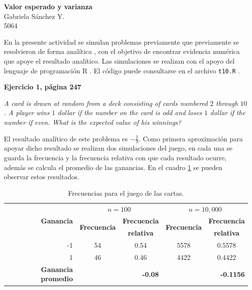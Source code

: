 \documentclass[12pt]{article}
\begin{document}
	\thispagestyle{empty}

	\begin{center}
		{\Large \bf Valor esperado y varianza}\\
		Gabriela S\'anchez Y.\\
		5064
	\end{center}
  
  	En la presente actividad se simulan problemas previamente que previamente se resolvieron de forma analítica \cite{mpa_gabyt9}, con el objetivo de encontrar evidencia numérica que apoye el resultado analítico. Las simulaciones se realizan con el apoyo del lenguaje de programación \textsc{R} \cite{rstatistics}. El código puede consultarse en el archivo \texttt{t10.R} \cite{mpa_gaby}.
	
	{\bf Ejercicio 1, página 247}
	
	{\em A card is drawn at random from a deck consisting of cards numbered $2$ through $10$. A player wins $1$ dollar if the number on the card is odd and loses $1$ dollar if the number if even. What is the expected value of his winnings?}
	
	El resultado analítico de este problema es $-\frac{1}{9}$. Como primera aproximación para apoyar dicho resultado se realizan dos simulaciones del juego, en cada una se guarda la frecuencia y la frecuencia relativa con que cada resultado ocurre, además se calcula el promedio de las ganancias. En el cuadro \ref{table_outcomes} se pueden observar estos resultados. 
	
	\begin{table}[h]
		\caption{Frecuencias para el juego de las cartas.}
		\label{table_outcomes}
		\centering
		\begin{tabular}{|r|c|c|c|c|}
			\hline
			\multirow{3}{*}{\bf Ganancia} & \multicolumn{2}{c|}{\bf $n=100$} & \multicolumn{2}{c|}{\bf $n=10,000$} \\
			\cline{2-5}
			& \multirow{2}{*}{\bf Frecuencia} & \bf Frecuencia  &  \multirow{2}{*}{\bf Frecuencia} & \bf Frecuencia\\
			& & \bf relativa & & \bf relativa \\
			\hline
			-1 & 54 & 0.54 & 5578 & 0.5578 \\
			1 & 46 & 0.46 & 4422 & 0.4422 \\
			\hline
			\bf Ganancia promedio & \multicolumn{2}{r|}{\bf -0.08} & \multicolumn{2}{r|}{\bf -0.1156} \\
			\hline
		\end{tabular}
	\end{table}
	
\end{document}
